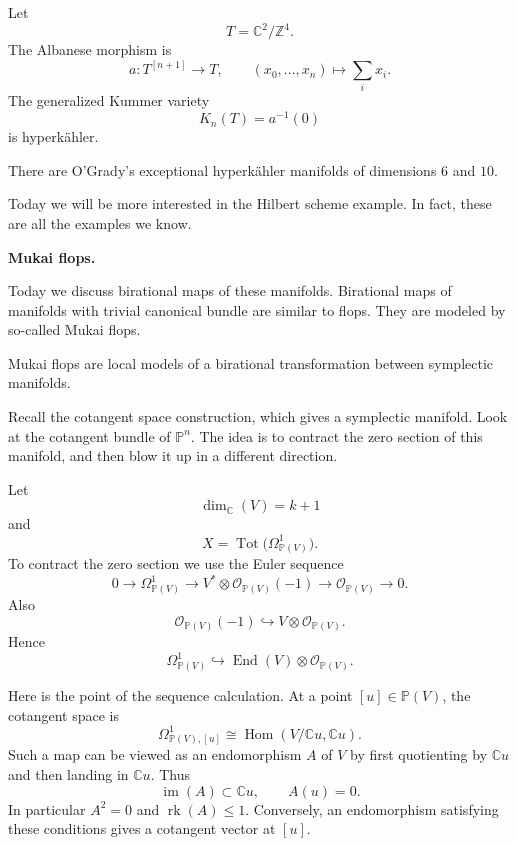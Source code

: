 \begin{example}
\label{example-let-t}
Let
\[
T=\mathbb{C}^2/\mathbb{Z}^4.
\]
The Albanese morphism is
\[
a:T^{[n+1]}\to T,
\qquad
(x_0,\ldots,x_n)\mapsto
\sum_i x_i.
\]
The generalized Kummer variety
\[
K_n(T)=a^{-1}(0)
\]
is hyperk\"ahler.
\end{example}

\begin{example}
\label{example-o-grady}
There are O'Grady's exceptional
hyperk\"ahler manifolds of dimensions
$6$ and $10$.
\end{example}

Today we will be more interested in
the Hilbert scheme example.
In fact, these are all the examples we
know.

\medskip\noindent
{\bf Mukai flops.}

Today we discuss birational maps of
these manifolds.
Birational maps of manifolds with
trivial canonical bundle are similar
to flops.
They are modeled by so-called Mukai
flops.

Mukai flops are local models of a
birational transformation between
symplectic manifolds.

Recall the cotangent space
construction, which gives a symplectic
manifold.
Look at the cotangent bundle of
$\mathbb{P}^n$.
The idea is to contract the zero
section of this manifold, and then
blow it up in a different direction.

Let
\[
\dim_{\mathbb{C}}(V)=k+1
\]
and
\[
X=
\operatorname{Tot}
\bigl(\Omega^1_{\mathbb{P}(V)}\bigr).
\]
To contract the zero section we use
the Euler sequence
\[
0\to \Omega^1_{\mathbb{P}(V)}
\to
V^*\otimes \mathcal{O}_{\mathbb{P}(V)}
(-1)
\to
\mathcal{O}_{\mathbb{P}(V)}
\to 0.
\]
Also
\[
\mathcal{O}_{\mathbb{P}(V)}(-1)
\hookrightarrow
V\otimes \mathcal{O}_{\mathbb{P}(V)}.
\]
Hence
\[
\Omega^1_{\mathbb{P}(V)}
\hookrightarrow
\operatorname{End}(V)
\otimes
\mathcal{O}_{\mathbb{P}(V)}.
\]

\begin{remark}
\label{remark-point-sequence}
Here is the point of the sequence
calculation.
At a point $[u]\in\mathbb{P}(V)$,
the cotangent space is
\[
\Omega^1_{\mathbb{P}(V),[u]}
\cong
\operatorname{Hom}
(V/\mathbb{C}u,\mathbb{C}u).
\]
Such a map can be viewed as an
endomorphism $A$ of $V$ by first
quotienting by $\mathbb{C}u$ and then
landing in $\mathbb{C}u$.
Thus
\[
\operatorname{im}(A)\subset \mathbb{C}u,
\qquad
A(u)=0.
\]
In particular $A^2=0$ and
$\operatorname{rk}(A)\leq 1$.
Conversely, an endomorphism satisfying
these conditions gives a cotangent
vector at $[u]$.
\end{remark}

